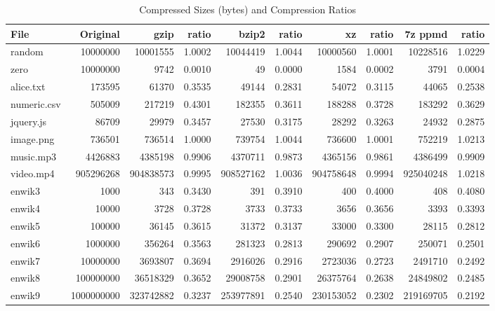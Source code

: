\documentclass[11pt]{article}
\begin{document}
\begin{table}[h!]
\caption{Compressed Sizes (bytes) and Compression Ratios}
\small
\begin{tabular}{| l | r | r r | r r | r r | r r |}
\hline
File & Original & gzip & ratio & bzip2 & ratio & xz & ratio & 7z ppmd & ratio\\
\hline
random & 10000000 & 10001555 & 1.0002 & 10044419 & 1.0044 & 10000560 & 1.0001 & 10228516 & 1.0229\\
zero & 10000000 & 9742 & 0.0010 & 49 & 0.0000 & 1584 & 0.0002 & 3791 & 0.0004\\
\hline
alice.txt & 173595 & 61370 & 0.3535 & 49144 & 0.2831 & 54072 & 0.3115 & 44065 & 0.2538\\
numeric.csv & 505009 & 217219 & 0.4301 & 182355 & 0.3611 & 188288 & 0.3728 & 183292 & 0.3629\\
jquery.js & 86709 & 29979 & 0.3457 & 27530 & 0.3175 & 28292 & 0.3263 & 24932 & 0.2875\\
image.png & 736501 & 736514 & 1.0000 & 739754 & 1.0044 & 736600 & 1.0001 & 752219 & 1.0213\\
music.mp3 & 4426883 & 4385198 & 0.9906 & 4370711 & 0.9873 & 4365156 & 0.9861 & 4386499 & 0.9909\\
video.mp4 & 905296268 & 904838573 & 0.9995 & 908527162 & 1.0036 & 904758648 & 0.9994 & 925040248 & 1.0218\\
\hline
enwik3 & 1000 & 343 & 0.3430 & 391 & 0.3910 & 400 & 0.4000 & 408 & 0.4080\\
enwik4 & 10000 & 3728 & 0.3728 & 3733 & 0.3733 & 3656 & 0.3656 & 3393 & 0.3393\\
enwik5 & 100000 & 36145 & 0.3615 & 31372 & 0.3137 & 33000 & 0.3300 & 28115 & 0.2812\\
enwik6 & 1000000 & 356264 & 0.3563 & 281323 & 0.2813 & 290692 & 0.2907 & 250071 & 0.2501\\
enwik7 & 10000000 & 3693807 & 0.3694 & 2916026 & 0.2916 & 2723036 & 0.2723 & 2491710 & 0.2492\\
enwik8 & 100000000 & 36518329 & 0.3652 & 29008758 & 0.2901 & 26375764 & 0.2638 & 24849802 & 0.2485\\
enwik9 & 1000000000 & 323742882 & 0.3237 & 253977891 & 0.2540 & 230153052 & 0.2302 & 219169705 & 0.2192\\
\hline
\end{tabular}
\end{table}
\end{document}
